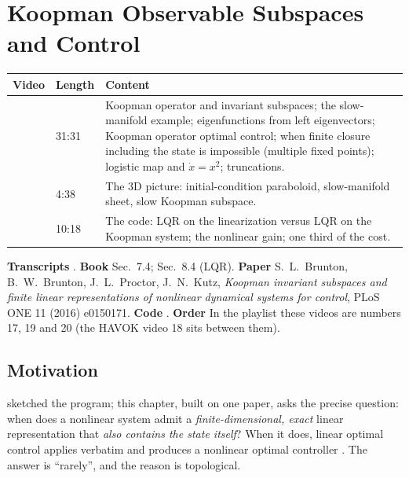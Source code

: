 \chapter{Koopman Observable Subspaces and Control}\label{ch:koopmancontrol}
\begin{paracol}{2}

\begin{sources}
\begin{tabularx}{\linewidth}{@{}V l L@{}}
\toprule
\textbf{Video} & \textbf{Length} & \textbf{Content}\\
\midrule
{} & 31:31 & Koopman operator and invariant subspaces; the slow-manifold example; eigenfunctions from left eigenvectors; Koopman operator optimal control; when finite closure including the state is impossible (multiple fixed points); logistic map and $\dot x=x^2$; truncations.\\
 & 4:38 & The 3D picture: initial-condition paraboloid, slow-manifold sheet, slow Koopman subspace.\\
 & 10:18 & The code: LQR on the linearization versus LQR on the Koopman system; the nonlinear gain; one third of the cost.\\
\bottomrule
\end{tabularx}

\smallskip
\textbf{Transcripts} .
\textbf{Book} Sec.~7.4; Sec.~8.4 (LQR).
\textbf{Paper} S.~L.~Brunton, B.~W.~Brunton, J.~L.~Proctor, J.~N.~Kutz, \emph{Koopman invariant subspaces and finite
linear representations of nonlinear dynamical systems for control}, PLoS ONE 11 (2016) e0150171.
\textbf{Code} .
\textbf{Order} In the playlist these videos are numbers 17, 19 and 20 (the HAVOK video 18 sits between them).
\end{sources}

\section*{Motivation}
 sketched the program; this chapter, built on one paper, asks the precise question: when does a
nonlinear system admit a \emph{finite-dimensional, exact} linear representation that \emph{also contains the
state itself}? When it does, linear optimal control applies verbatim and produces a nonlinear optimal
controller . The answer is ``rarely'', and the reason is topological.


\end{paracol}

